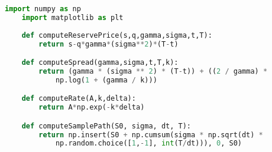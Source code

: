 \begin{lstlisting}[language=Python, caption=Auxiliary Functions]
    import numpy as np
    import matplotlib as plt
        
    def computeReservePrice(s,q,gamma,sigma,t,T):
        return s-q*gamma*(sigma**2)*(T-t)

    def computeSpread(gamma,sigma,t,T,k):
        return (gamma * (sigma ** 2) * (T-t)) + ((2 / gamma) * 
            np.log(1 + (gamma / k)))

    def computeRate(A,k,delta):
        return A*np.exp(-k*delta)

    def computeSamplePath(S0, sigma, dt, T):
        return np.insert(S0 + np.cumsum(sigma * np.sqrt(dt) * 
            np.random.choice([1,-1], int(T/dt))), 0, S0)
\end{lstlisting}

